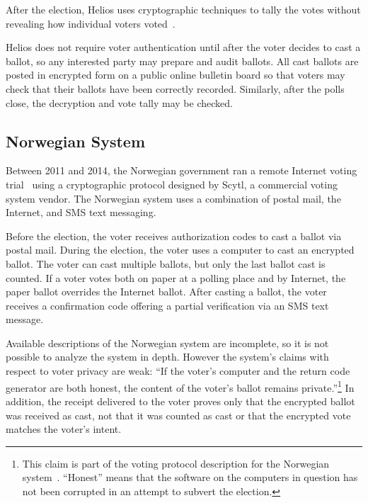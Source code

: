 After the election, Helios uses cryptographic techniques to tally the
votes without revealing how individual voters
voted~\cite{bulens2011,tsoukalas2013}.

Helios does not require voter authentication until after the voter
decides to cast a ballot, so any interested party may prepare and
audit ballots. All cast ballots are posted in encrypted form on a
public online bulletin board so that voters may check that their
ballots have been correctly recorded. Similarly, after the polls
close, the decryption and vote tally may be checked.

\subsection{Norwegian System}

Between 2011 and 2014, the Norwegian government ran a remote Internet
voting trial~\cite{gjosteen2012} using a cryptographic protocol
designed by Scytl, a commercial voting system vendor.  The Norwegian
system uses a combination of postal mail, the Internet, and SMS text
messaging. 

Before the election, the voter receives authorization codes to cast a
ballot via postal mail. During the election, the voter uses a computer
to cast an encrypted ballot. The voter can cast multiple ballots, but
only the last ballot cast is counted. If a voter votes both on paper
at a polling place and by Internet, the paper ballot overrides the
Internet ballot. After casting a ballot, the voter receives a
confirmation code offering a partial verification via an SMS text
message.

Available descriptions of the Norwegian system are incomplete, so it
is not possible to analyze the system in depth. However the system's
claims with respect to voter privacy are weak: ``If the voter's
computer and the return code generator are both honest, the content of
the voter's ballot remains private.''\footnote{This claim is part of
  the voting protocol description for the Norwegian
  system~\cite{gjosteen2012}. ``Honest'' means that the software on
  the computers in question has not been corrupted in an attempt to
  subvert the election.} In addition, the receipt delivered to the
voter proves only that the encrypted ballot was received as cast, not
that it was counted as cast or that the encrypted vote matches the
voter's intent.

